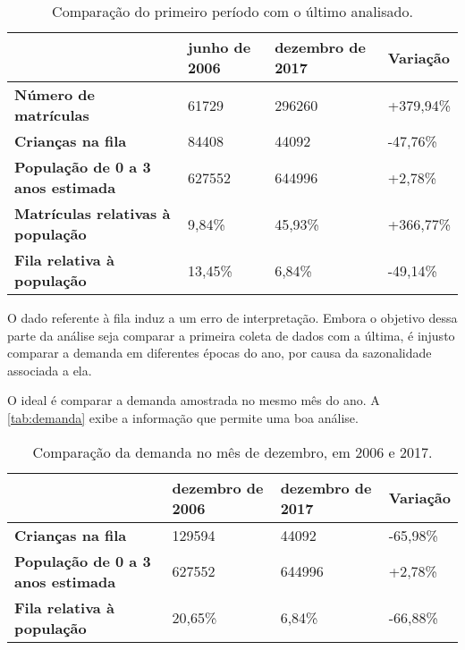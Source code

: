 \documentclass[12pt, a4]{book}
\begin{document}
\begin{table}[H]
	\begin{tabular}{|l|l|l|l|}
		\hline
		\textbf{}                                 & \textbf{junho de 2006} & \textbf{dezembro de 2017} & \textbf{Variação} \\ \hline
		\textbf{Número de matrículas}             & 61729                  & 296260                    & +379,94\%       \\ \hline
		\textbf{Crianças na fila}                 & 84408                  & 44092                     & -47,76\%        \\ \hline
		\textbf{População de 0 a 3 anos estimada} & 627552                 & 644996                    & +2,78\%         \\ \hline
		\textbf{Matrículas relativas à população} & 9,84\%              & 45,93\%               & +366,77\%       \\ \hline
		\textbf{Fila relativa à população}        & 13,45\%             & 6,84\%                 & -49,14\%        \\ \hline
	\end{tabular}
	\caption{Comparação do primeiro período com o último analisado.}
	\label{tab:saopaulo}
\end{table}

O dado referente à fila induz a um erro de interpretação. Embora o objetivo dessa parte da análise seja comparar a primeira coleta de dados com a última, é injusto comparar a demanda em diferentes épocas do ano, por causa da sazonalidade associada a ela.

O ideal é comparar a demanda amostrada no mesmo mês do ano. A \autoref{tab:demanda} exibe a informação que permite uma boa análise.

\begin{table}[H]
	\begin{tabular}{|l|l|l|l|}
		\hline
		\textbf{}                                 & \textbf{dezembro de 2006} & \textbf{dezembro de 2017} & \textbf{Variação} \\ \hline
		\textbf{Crianças na fila}                 & 129594                    & 44092                     & -65,98\%       \\ \hline
		\textbf{População de 0 a 3 anos estimada} & 627552                    & 644996                    & +2,78\%        \\ \hline
		\textbf{Fila relativa à população}        & 20,65\%               & 6,84\%                  & -66,88\%        \\ \hline
	\end{tabular}
	\caption{Comparação da demanda no mês de dezembro, em 2006 e 2017.}
	\label{tab:demanda}
\end{table}
\end{document}
